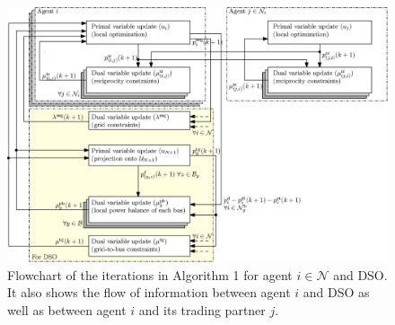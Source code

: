\documentclass[10pt]{article}
\newtheorem{definitiox	n}{Definition}{\it}{}
\newcommand{\mc}{\mathcal}
\newcommand{\0}{\mathbf{0}}
\newcommand{\1}{\mathbf{1}}
\begin{document}
\begin{figure}
\centering
\includegraphics[scale=0.8]{Algorithm1_v2.eps}
\caption{Flowchart of the iterations in Algorithm 1 for agent $i \in \mc N$ and DSO. It also shows the flow of information between agent $i$ and DSO as well as between agent $i$ and its trading partner $j$.}
\end{figure}

\end{document}
